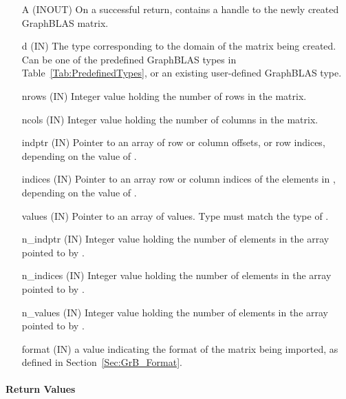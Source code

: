 \begin{itemize}[leftmargin=1.1in]
    \item[{\sf A}] ({\sf INOUT})   On a successful return, contains a handle 
                   to the newly created GraphBLAS matrix.
    \item[{\sf d}] ({\sf IN})    The type corresponding to the domain of the 
                   matrix being created. Can be one of the predefined GraphBLAS
                   types in Table~\ref{Tab:PredefinedTypes},  or an existing
                   user-defined GraphBLAS type. 
    \item[{\sf nrows}] ({\sf IN}) Integer value holding the number of rows in the matrix.
    \item[{\sf ncols}] ({\sf IN}) Integer value holding the number of columns in the matrix.
    \item[{\sf indptr}] ({\sf IN}) Pointer to an array of row or column offsets, 
                   or row indices, depending on the value of .
    \item[{\sf indices}] ({\sf IN}) Pointer to an array row or column indices 
                   of the elements in , depending on the value of .
    \item[{\sf values}] ({\sf IN}) Pointer to an array of values.  Type must match the type of .
    \item[{\sf n\_indptr}] ({\sf IN}) Integer value holding the number of 
                   elements in the array pointed to by .
    \item[{\sf n\_indices}] ({\sf IN}) Integer value holding the number of 
                   elements in the array pointed to by .
    \item[{\sf n\_values}] ({\sf IN}) Integer value holding the number of 
                   elements in the array pointed to by .
    \item[{\sf format}] ({\sf IN}) a value indicating the format of the matrix 
                   being imported, as defined in Section~\ref{Sec:GrB_Format}.
\end{itemize}

\paragraph{Return Values}

